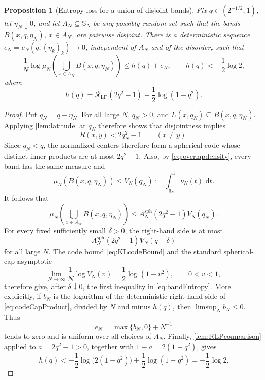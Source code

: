 \documentclass[11pt,reqno]{amsart}
\numberwithin{equation}{section}
\theoremstyle{plain}
\newtheorem{proposition}[proposition]{Proposition}
\theoremstyle{definition}
\theoremstyle{remark}
\newcommand{\SN}{\mathbb{S}_N}
\newcommand{\1}{\mathbf 1}
\newcommand{\dd}{\,\mathrm d}
\begin{document}
\begin{proposition}[Entropy loss for a union of disjoint bands]
\label{prop:bandEntropy}
Fix \(q\in(2^{-1/2},1)\), let \(\eta_N\downarrow0\), and let
\(A_N\subseteq\SN\) be any possibly random set such that the bands
\(B(x,q,\eta_N)\), \(x\in A_N\), are pairwise disjoint.  There is a
deterministic sequence \(e_N=e_N(q,(\eta_k)_k)\to0\), independent of
\(A_N\) and of the disorder, such that
\begin{equation}\label{eq:bandEntropy}
 \frac1N\log
 \mu_N\left(\bigcup_{x\in A_N}B(x,q,\eta_N)\right)
 \leq h(q)+e_N,
 \qquad h(q)<-\frac12\log2,
\end{equation}
where
\begin{equation}\label{eq:hq}
 h(q)=\mathcal R_{\mathrm{LP}}(2q^2-1)
       +\frac12\log(1-q^2).
\end{equation}
\end{proposition}

\begin{proof}
Put \(q_N=q-\eta_N\).  For all large \(N\), \(q_N>0\), and
\(L(x,q_N)\subseteq B(x,q,\eta_N)\).  Applying
\cref{lem:latitude} at \(q_N\) therefore shows that disjointness
implies
\[
 R(x,y)<2q_N^2-1\qquad(x\ne y).
\]
Since \(q_N<q\), the normalized centers therefore form a spherical
code whose distinct inner products are at most \(2q^2-1\).  Also, by
\eqref{eq:overlapdensity}, every band has
the same measure and
\[
 \mu_N(B(x,q,\eta_N))
 \leq V_N(q_N):=\int_{q_N}^1\nu_N(t)\,\dd t.
\]
It follows that
\begin{equation}\label{eq:codeCapProduct}
 \mu_N\left(\bigcup_{x\in A_N}B(x,q,\eta_N)\right)
 \leq A_N^{\mathrm{sph}}(2q^2-1)V_N(q_N).
\end{equation}
For every fixed sufficiently small \(\delta>0\), the right-hand side
is at most
\[
 A_N^{\mathrm{sph}}(2q^2-1)V_N(q-\delta)
\]
for all large \(N\).  The code bound \eqref{eq:KLcodeBound} and the
standard spherical-cap asymptotic
\[
 \lim_{N\to\infty}\frac1N\log V_N(v)
 =\frac12\log(1-v^2),\qquad 0<v<1,
\]
therefore give, after \(\delta\downarrow0\), the first inequality in
\eqref{eq:bandEntropy}.  More explicitly, if \(b_N\) is the logarithm
of the deterministic right-hand side of \eqref{eq:codeCapProduct},
divided by \(N\) and minus \(h(q)\), then \(\limsup_N b_N\leq0\).
Thus
\[
 e_N=\max\{b_N,0\}+N^{-1}
\]
tends to zero and is uniform over all choices of \(A_N\).  Finally,
\cref{lem:RLPcomparison} applied to
\(a=2q^2-1>0\), together with
\(1-a=2(1-q^2)\), gives
\[
 h(q)<-\frac12\log\bigl(2(1-q^2)\bigr)
       +\frac12\log(1-q^2)
 =-\frac12\log2.
\]
\end{proof}
\end{document}
